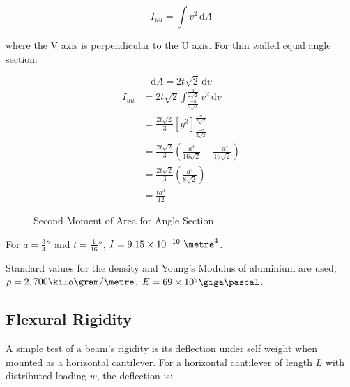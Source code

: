 \documentclass[12pt]{article} %
\begin{document}
\begin{appendices}
$$ I_{uu} = \int \! v^2 \, \mathrm{d}A $$

where the V axis is perpendicular to the U axis.  For thin walled equal angle
section:

$$ \mathrm{d}A = 2 t \sqrt{2} \, \mathrm{d}v $$
\begin{align*}
I_{uu} &= 2 t \sqrt{2} \int_{\frac{-a}{2\sqrt{2}}}^{\frac{a}{2\sqrt{2}}}
\! v^2 \, \mathrm{d}v \\
       &= \frac{2t\sqrt{2}}{3} \left[ y^3 \right]_{\frac{-a}{2\sqrt{2}}}
          ^{\frac{a}{2\sqrt{2}}} \\
       &= \frac{2t\sqrt{2}}{3} \left( \frac{a^3}{16\sqrt{2}} -
          \frac{-a^3}{16\sqrt{2}} \right) \\
       &= \frac{2t\sqrt{2}}{3} \left( \frac{a^3}{8\sqrt{2}} \right) \\
       &= \frac{ta^3}{12}
\end{align*}

\begin{figure}[h]
    \centering
    \caption{Second Moment of Area for Angle Section}
    \label{fig:iangle}
\end{figure}

For $a=\frac{3}{4}''$ and $t=\frac{1}{16}''$,
$I = 9.15\times10^{-10}~\metre^4$.

Standard values for the density and Young's Modulus of aluminium are used,
$\rho=2,700\kilo\gram/\metre$, $E = 69 \times 10^9 \giga\pascal$.

\subsection{Flexural Rigidity}
A simple test of a beam's rigidity is its deflection under self weight when
mounted as a horizontal cantilever.  For a horizontal cantilever of length $L$
with distributed loading $w$, the deflection is:


\end{appendices}
\end{document}
